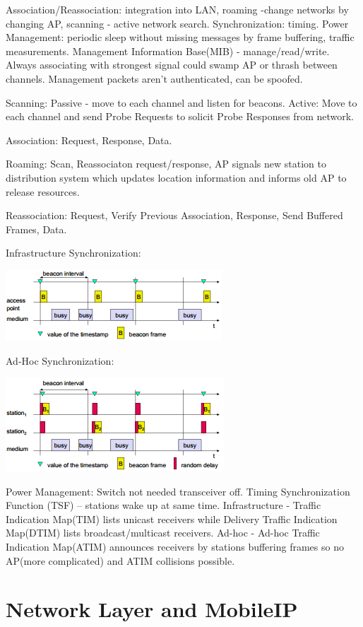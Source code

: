\documentclass[9pt]{extarticle}
\begin{document}
\begin{multicols}{2}
Association/Reassociation: integration into LAN, roaming -change networks by changing AP, scanning - active network search. Synchronization: timing. Power Management: periodic sleep without missing messages by frame buffering, traffic measurements. Management Information Base(MIB) - manage/read/write. Always associating with strongest signal could swamp AP or thrash between channels. Management packets aren't authenticated, can be spoofed.

Scanning: Passive - move to each channel and listen for beacons. Active:  Move to each channel and send Probe Requests to solicit Probe Responses from network.

Association: Request, Response, Data.

Roaming: Scan, Reassociaton request/response, AP signals new station to distribution system which updates location information and informs old AP to release resources.

Reassociation: Request, Verify Previous Association, Response, Send Buffered Frames, Data.

Infrastructure Synchronization:

\includegraphics{infrastructuresynchronization.png}

Ad-Hoc Synchronization: 

\includegraphics{adhocsynchronization.png}

Power Management: Switch not needed transceiver off. Timing Synchronization Function (TSF) – stations wake up at same time. Infrastructure - Traffic Indication Map(TIM) lists unicast receivers while Delivery Traffic Indication Map(DTIM) lists broadcast/multicast receivers. Ad-hoc - Ad-hoc Traffic Indication Map(ATIM) announces receivers by stations buffering frames so no AP(more complicated) and ATIM collisions possible.

\section{Network Layer and MobileIP}


\end{multicols}
\end{document}
